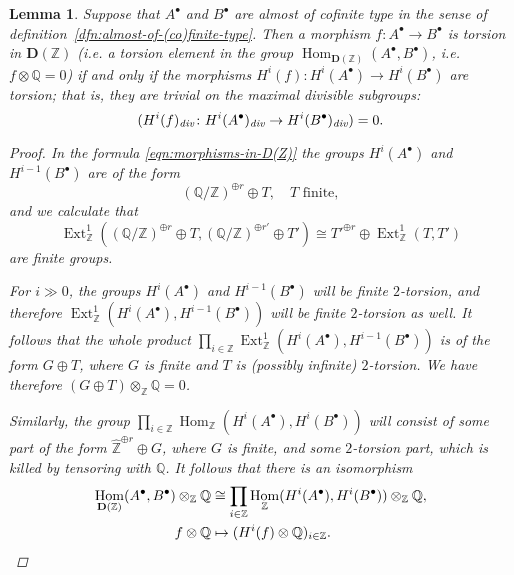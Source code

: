 \documentclass[leqno,12pt]{article}
\theoremstyle{plain}
\newtheorem{lemma}[theorem]{\indent\sc Lemma}
\theoremstyle{definition}
\DeclareMathOperator{\Hom}{Hom}
\DeclareMathOperator{\Ext}{Ext}
\newcommand{\QQ}{\mathbb{Q}}
\newcommand{\ZZ}{\mathbb{Z}}
\renewcommand{\div}{\text{\it div}}
\begin{document}
\begin{lemma}
  \label{lemma:torsion-morphisms-in-D(Z)}
  Suppose that $A^\bullet$ and $B^\bullet$ are almost of cofinite type in the
  sense of definition~{\rm\ref{dfn:almost-of-(co)finite-type}}. Then a morphism
  $f\colon A^\bullet\to B^\bullet$ is torsion in $\mathbf{D} (\ZZ)$
  (i.e. a torsion element in the group
  $\Hom_{\mathbf{D} (\ZZ)} (A^\bullet, B^\bullet)$, i.e.
  $f\otimes \mathbb{Q} = 0$) if and only if the morphisms
  $H^i (f)\colon H^i (A^\bullet) \to H^i (B^\bullet)$
  are torsion; that is, they are trivial on the maximal divisible subgroups:
  $$(H^i (f)_\div\colon H^i (A^\bullet)_\div \to H^i (B^\bullet)_\div) = 0.$$

  \begin{proof}
    In the formula \eqref{eqn:morphisms-in-D(Z)} the groups $H^i (A^\bullet)$
    and $H^{i-1} (B^\bullet)$ are of the form
    \[ (\mathbb{Q}/\mathbb{Z})^{\oplus r} \oplus T,
      \quad T\text{ finite}, \]
    and we calculate that
    \[ \Ext_\ZZ^1 ((\QQ/\ZZ)^{\oplus r} \oplus T, (\QQ/\ZZ)^{\oplus r'} \oplus T') \cong
    T'^{\oplus r} \oplus \Ext_\ZZ^1 (T, T') \]
    are finite groups.

    For $i \gg 0$, the groups $H^i (A^\bullet)$ and $H^{i-1} (B^\bullet)$ will
    be finite $2$-torsion, and therefore
    $\Ext_\ZZ^1 (H^i (A^\bullet), H^{i-1} (B^\bullet))$ will be finite
    $2$-torsion as well. It follows that the whole product
    $\prod_{i\in \mathbb{Z}} \Ext_\ZZ^1 (H^i (A^\bullet), H^{i-1} (B^\bullet))$
    is of the form $G \oplus T$, where $G$ is finite and $T$ is
    (possibly infinite) $2$-torsion. We have therefore
    $(G \oplus T)\otimes_\ZZ \QQ = 0$.

    Similarly, the group
    $\prod_{i\in\ZZ} \Hom_\ZZ (H^i (A^\bullet), H^i (B^\bullet))$ will consist
    of some part of the form $\widehat{\ZZ}^{\oplus r} \oplus G$, where $G$
    is finite, and some $2$-torsion part, which is killed by tensoring with
    $\QQ$. It follows that there is an isomorphism
    \begin{align*}
      \Hom_{\mathbf{D} (\ZZ)} (A^\bullet, B^\bullet)\otimes_\ZZ \mathbb{Q} & \cong
      \prod_{i\in \mathbb{Z}} \Hom_\ZZ (H^i (A^\bullet), H^i (B^\bullet)) \otimes_\ZZ \mathbb{Q}, \\
      f\otimes\QQ & \mapsto (H^i (f) \otimes \QQ)_{i\in\ZZ}. \qedhere
    \end{align*}
  \end{proof}
\end{lemma}
\end{document}
